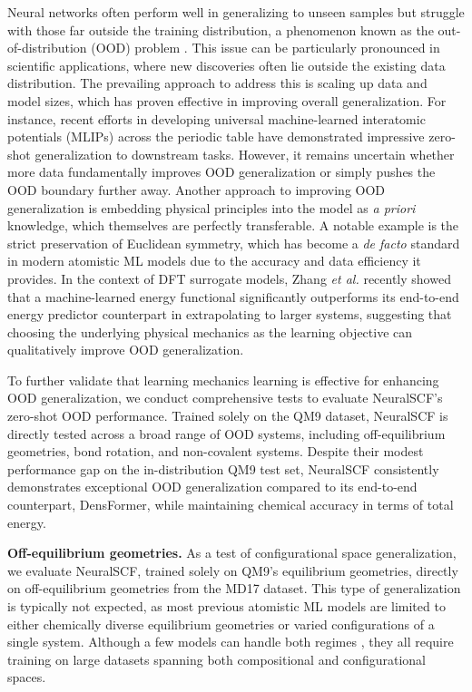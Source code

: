 \documentclass[%
reprint,
superscriptaddress,
bibnotes,
amsmath,amssymb,
aps,
floatfix, %
]{revtex4-2}
\begin{document}
\noindent Neural networks often perform well in generalizing to unseen samples but struggle with those far outside the training distribution, a phenomenon known as the out-of-distribution (OOD) problem \cite{zhang2023artificial}. This issue can be particularly pronounced in scientific applications, where new discoveries often lie outside the existing data distribution. The prevailing approach to address this is scaling up data and model sizes, which has proven effective in improving overall generalization. For instance, recent efforts in developing universal machine-learned interatomic potentials (MLIPs) across the periodic table \cite{chen22universal, deng2023chgnet, merchant2023scaling, zhang2023dpa2, yang2024mattersim} have demonstrated impressive zero-shot generalization to downstream tasks. However, it remains uncertain whether more data fundamentally improves OOD generalization or simply pushes the OOD boundary further away. Another approach to improving OOD generalization is embedding physical principles into the model as \textit{a priori} knowledge, which themselves are perfectly transferable. A notable example is the strict preservation of Euclidean symmetry, which has become a \textit{de facto} standard in modern atomistic ML models due to the accuracy and data efficiency it provides. In the context of DFT surrogate models, Zhang \textit{et al.} \cite{zhang2024ofdft} recently showed that a machine-learned energy functional significantly outperforms its end-to-end energy predictor counterpart in extrapolating to larger systems, suggesting that choosing the underlying physical mechanics as the learning objective can qualitatively improve OOD generalization.

To further validate that learning mechanics learning is effective for enhancing OOD generalization, we conduct comprehensive tests to evaluate NeuralSCF's zero-shot OOD performance. Trained solely on the QM9 dataset, NeuralSCF is directly tested across a broad range of OOD systems, including off-equilibrium geometries, bond rotation, and non-covalent systems. Despite their modest performance gap on the in-distribution QM9 test set, NeuralSCF consistently demonstrates exceptional OOD generalization compared to its end-to-end counterpart, DensFormer, while maintaining chemical accuracy in terms of total energy.

\vspace{\baselineskip}

\noindent\textbf{Off-equilibrium geometries.} As a test of configurational space generalization, we evaluate NeuralSCF, trained solely on QM9's equilibrium geometries, directly on off-equilibrium geometries from the MD17 dataset. This type of generalization is typically not expected, as most previous atomistic ML models are limited to either chemically diverse equilibrium geometries or varied configurations of a single system. Although a few models can handle both regimes \cite{chen22universal, deng2023chgnet, merchant2023scaling, zhang2023dpa2, yang2024mattersim}, they all require training on large datasets spanning both compositional and configurational spaces.
\end{document}
